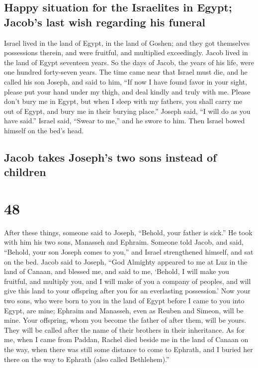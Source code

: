 \hypertarget{happy-situation-for-the-israelites-in-egypt-jacobs-last-wish-regarding-his-funeral}{%
\subsection{Happy situation for the Israelites in Egypt; Jacob's last
wish regarding his
funeral}\label{happy-situation-for-the-israelites-in-egypt-jacobs-last-wish-regarding-his-funeral}}

 Israel lived in the land of Egypt, in the land of
Goshen; and they got themselves possessions therein, and were fruitful,
and multiplied exceedingly.  Jacob lived in the land of
Egypt seventeen years. So the days of Jacob, the years of his life, were
one hundred forty-seven years.  The time came near that
Israel must die, and he called his son Joseph, and said to him, ``If now
I have found favor in your sight, please put your hand under my thigh,
and deal kindly and truly with me. Please don't bury me in Egypt,
 but when I sleep with my fathers, you shall carry me out
of Egypt, and bury me in their burying place.'' Joseph said, ``I will do
as you have said.''  Israel said, ``Swear to me,'' and he
swore to him. Then Israel bowed himself on the bed's head.

\hypertarget{jacob-takes-josephs-two-sons-instead-of-children}{%
\subsection{Jacob takes Joseph's two sons instead of
children}\label{jacob-takes-josephs-two-sons-instead-of-children}}

\hypertarget{section-47}{%
\section{48}\label{section-47}}

 After these things, someone said to Joseph, ``Behold,
your father is sick.'' He took with him his two sons, Manasseh and
Ephraim.  Someone told Jacob, and said, ``Behold, your son
Joseph comes to you,'' and Israel strengthened himself, and sat on the
bed.  Jacob said to Joseph, ``God Almighty appeared to me
at Luz in the land of Canaan, and blessed me,  and said to
me, `Behold, I will make you fruitful, and multiply you, and I will make
of you a company of peoples, and will give this land to your offspring
after you for an everlasting possession.'  Now your two
sons, who were born to you in the land of Egypt before I came to you
into Egypt, are mine; Ephraim and Manasseh, even as Reuben and Simeon,
will be mine.  Your offspring, whom you become the father
of after them, will be yours. They will be called after the name of
their brothers in their inheritance.  As for me, when I
came from Paddan, Rachel died beside me in the land of Canaan on the
way, when there was still some distance to come to Ephrath, and I buried
her there on the way to Ephrath (also called Bethlehem).''

